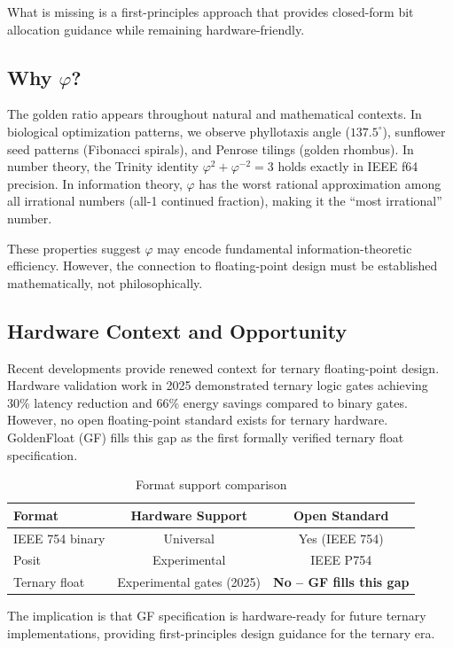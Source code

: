 \documentclass{article}
\begin{document}
What is missing is a first-principles approach that provides closed-form bit allocation guidance while remaining hardware-friendly.

\subsection{Why $\varphi$?}

The golden ratio appears throughout natural and mathematical contexts. In biological optimization patterns, we observe phyllotaxis angle ($137.5^\circ$), sunflower seed patterns (Fibonacci spirals), and Penrose tilings (golden rhombus). In number theory, the Trinity identity $\varphi^2 + \varphi^{-2} = 3$ holds exactly in IEEE f64 precision. In information theory, $\varphi$ has the worst rational approximation among all irrational numbers (all-1 continued fraction), making it the ``most irrational'' number.

These properties suggest $\varphi$ may encode fundamental information-theoretic efficiency. However, the connection to floating-point design must be established mathematically, not philosophically.

\subsection{Hardware Context and Opportunity}

Recent developments provide renewed context for ternary floating-point design. Hardware validation work in 2025 demonstrated ternary logic gates achieving 30\% latency reduction and 66\% energy savings compared to binary gates. However, no open floating-point standard exists for ternary hardware. GoldenFloat (GF) fills this gap as the first formally verified ternary float specification.

\begin{table}[h]
\centering
\begin{tabular}{lcc}
\toprule
Format & Hardware Support & Open Standard \\
\midrule
IEEE 754 binary & Universal & Yes (IEEE 754) \\
Posit & Experimental & IEEE P754 \\
Ternary float & Experimental gates (2025) & \textbf{No -- GF fills this gap} \\
\bottomrule
\end{tabular}
\caption{Format support comparison}
\end{table}

The implication is that GF specification is hardware-ready for future ternary implementations, providing first-principles design guidance for the ternary era.
\end{document}
